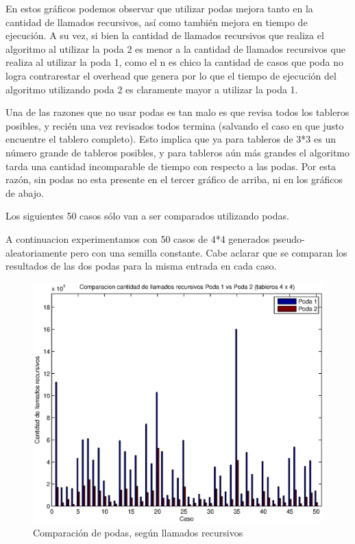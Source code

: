 En estos gráficos podemos observar que utilizar podas mejora tanto en la cantidad de llamados recursivos, así como también mejora en tiempo de ejecución. A su vez, si bien la cantidad de llamados recursivos que realiza el algoritmo al utilizar la poda 2 es menor a la cantidad de llamados recursivos que realiza al utilizar la poda 1, como el n es chico la cantidad de casos que poda no logra contrarestar el overhead que genera por lo que el tiempo de ejecución del algoritmo utilizando poda 2 es claramente mayor a utilizar la poda 1.

Una de las razones que no usar podas es tan malo es que revisa todos los tableros posibles, y recién una vez revisados todos termina (salvando el caso en que justo encuentre el tablero completo). Esto implica que ya para tableros de 3*3 es un número grande de tableros posibles, y para tableros aún más grandes el algoritmo tarda una cantidad incomparable de tiempo con respecto a las podas. Por esta razón, sin podas no esta presente en el tercer gráfico de arriba, ni en los gráficos de abajo.

Los siguientes 50 casos sólo van a ser comparados utilizando podas.

A continuacion experimentamos con 50 casos de 4*4 generados pseudo-aleatoriamente pero con una semilla constante. Cabe aclarar que se comparan los resultados de las dos podas para la misma entrada en cada caso.

\begin{center}
  \begin{figure}[H]
    \includegraphics[width=\linewidth]{problema3/graficos/comparacion_podas1y2_llamados_recursivos.eps}
    \caption{Comparación de podas, según llamados recursivos}
    \label{fig:problema3-podas-llamados}
  \end{figure}
\end{center}

